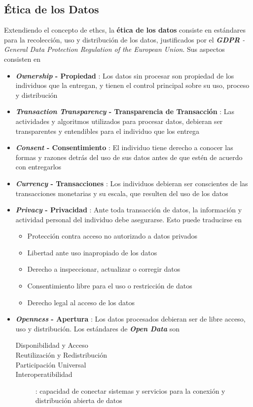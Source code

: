 \subsection{Ética de los Datos}
Extendiendo el concepto de \gls{ethcs}, la \textbf{ética de los datos} consiste en estándares para la recolección, uso y distribución de los datos, justificados por el \textit{\textbf{GDPR} - General Data Protection Regulation of the European Union}. Sus aspectos consisten en
\begin{itemize}
    \item {\textbf{\textit{Ownership} - Propiedad} : Los datos sin procesar son propiedad de los individuos que la entregan, y tienen el control principal sobre su uso, proceso y distribución}
    \item {\textbf{\textit{Transaction Transparency} - Transparencia de Transacción} : Las actividades y algoritmos utilizados para procesar datos, debieran ser transparentes y entendibles para el individuo que los entrega}
    \item {\textbf{\textit{Consent} - Consentimiento} : El individuo tiene derecho a conocer las formas y razones detrás del uso de sus datos antes de que estén de acuerdo con entregarlos}
    \item {\textbf{\textit{Currency} - Transacciones} : Los individuos debieran ser conscientes de las transacciones monetarias y su escala, que resulten del uso de los datos}
    \item {\textbf{\textit{Privacy} - Privacidad} : Ante toda transacción de datos, la información y actividad personal del individuo debe asegurarse. Esto puede traducirse en
    \begin{itemize}
        \item {Protección contra acceso no autorizado a datos privados}
        \item {Libertad ante uso inapropiado de los datos}
        \item {Derecho a inspeccionar, actualizar o corregir datos}
        \item {Consentimiento libre para el uso o restricción de datos}
        \item {Derecho legal al acceso de los datos}
    \end{itemize}}
    \item {\textbf{\textit{Openness} - Apertura} : Los datos procesados debieran ser de libre acceso, uso y distribución. Los estándares de \textbf{\textit{Open Data}} son
    \begin{description}
        \item [Disponibilidad y Acceso]
        \item [Reutilización y Redistribución]
        \item [Participación Universal]
        \item [Interoperatibilidad]{ : capacidad de conectar sistemas y servicios para la conexión y distribución abierta de datos}
    \end{description}}
\end{itemize}

